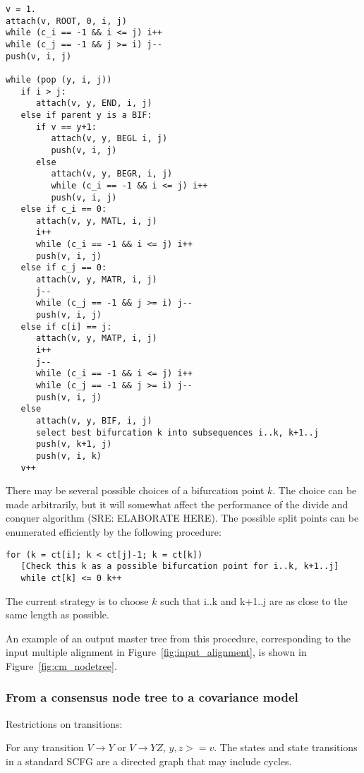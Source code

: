 \documentclass[11pt]{article}
\begin{document}
\begin{verbatim}
v = 1.
attach(v, ROOT, 0, i, j)
while (c_i == -1 && i <= j) i++
while (c_j == -1 && j >= i) j-- 	
push(v, i, j)

while (pop (y, i, j))
   if i > j: 
      attach(v, y, END, i, j)
   else if parent y is a BIF:
      if v == y+1:
         attach(v, y, BEGL i, j)
         push(v, i, j)
      else
         attach(v, y, BEGR, i, j)
         while (c_i == -1 && i <= j) i++
         push(v, i, j)
   else if c_i == 0:
      attach(v, y, MATL, i, j)
      i++
      while (c_i == -1 && i <= j) i++
      push(v, i, j)
   else if c_j == 0:
      attach(v, y, MATR, i, j)
      j--
      while (c_j == -1 && j >= i) j-- 	
      push(v, i, j)
   else if c[i] == j:
      attach(v, y, MATP, i, j)
      i++
      j--
      while (c_i == -1 && i <= j) i++
      while (c_j == -1 && j >= i) j-- 	
      push(v, i, j)
   else 
      attach(v, y, BIF, i, j)
      select best bifurcation k into subsequences i..k, k+1..j
      push(v, k+1, j)
      push(v, i, k)
   v++
\end{verbatim}

There may be several possible choices of a bifurcation point $k$.  The
choice can be made arbitrarily, but it will somewhat affect the
performance of the divide and conquer algorithm (SRE: ELABORATE
HERE). The possible split points can be enumerated efficiently by the
following procedure:

\begin{verbatim}
for (k = ct[i]; k < ct[j]-1; k = ct[k])
   [Check this k as a possible bifurcation point for i..k, k+1..j]
   while ct[k] <= 0 k++
\end{verbatim}

The current strategy is to choose $k$ such that i..k and k+1..j are as
close to the same length as possible.

An example of an output master tree from this procedure, corresponding
to the input multiple alignment in Figure~\ref{fig:input_alignment},
is shown in Figure~\ref{fig:cm_nodetree}.

\subsubsection{From a consensus node tree to a covariance model}




Restrictions on transitions:

For any transition $V \rightarrow Y$ or $V \rightarrow YZ$, $y,z >=
v$. The states and state transitions in a standard SCFG are a directed
graph that may include cycles. 
\end{document}
